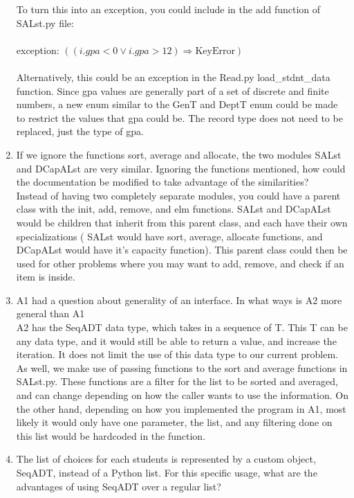 \documentclass[12pt]{article}
\begin{document}
\begin{enumerate}[label=\alph*]
To turn this into an exception, you could include in the add function of SALst.py file:\\ \\ exception: $((i.gpa < 0 \vee i.gpa > 12)  \Rightarrow \text{KeyError} )$ \\ \\
Alternatively, this could be an exception in the Read.py load\_stdnt\_data function. Since gpa values are generally part of a set of discrete and finite numbers, a new enum similar to the GenT and DeptT enum could be made to restrict the values that gpa could be. The record type does not need to be replaced, just the type of gpa. \\

\item If we ignore the functions sort, average and allocate, the two modules SALst and DCapALst are very similar. Ignoring the functions mentioned, how could the documentation be modified to take advantage of the similarities?  \\ 

Instead of having two completely separate modules, you could have a parent class with the init, add, remove, and elm functions. SALst and DCapALst would be children that inherit from this parent class, and each have their own specializations ( SALst would have sort, average, allocate functions, and DCapALst would have it's capacity function). This parent class could then be used for other problems where you may want to add, remove, and check if an item is inside.

\item A1 had a question about generality of an interface. In what ways is A2 more general than A1 \\ 

A2 has the SeqADT data type, which takes in a sequence of T. This T can be any data type, and it would still be able to return a value, and increase the iteration. It does not limit the use of this data type to our current problem. As well, we make use of passing functions to the sort and average functions in SALst.py. These functions are a filter for the list to be sorted and averaged, and can change depending on how the caller wants to use the information. On the other hand, depending on how you implemented the program in A1, most likely it would only have one parameter, the list, and any filtering done on this list would be hardcoded in the function.

\item The list of choices for each students is represented by a custom object, SeqADT, instead of a Python list. For this specific usage, what are the advantages of using SeqADT over a regular list?


\end{enumerate}
\end{document}
